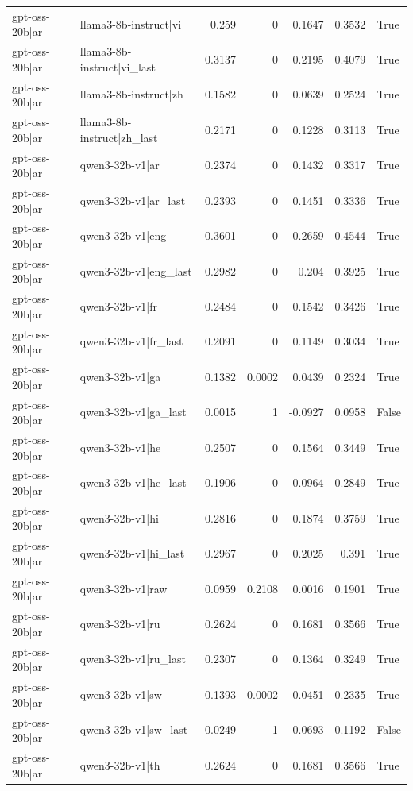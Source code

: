 \begin{table}
\begin{tabular}{l l r r r r l}
gpt-oss-20b|ar & llama3-8b-instruct|vi & 0.259 & 0 & 0.1647 & 0.3532 & True \\
gpt-oss-20b|ar & llama3-8b-instruct|vi_last & 0.3137 & 0 & 0.2195 & 0.4079 & True \\
gpt-oss-20b|ar & llama3-8b-instruct|zh & 0.1582 & 0 & 0.0639 & 0.2524 & True \\
gpt-oss-20b|ar & llama3-8b-instruct|zh_last & 0.2171 & 0 & 0.1228 & 0.3113 & True \\
gpt-oss-20b|ar & qwen3-32b-v1|ar & 0.2374 & 0 & 0.1432 & 0.3317 & True \\
gpt-oss-20b|ar & qwen3-32b-v1|ar_last & 0.2393 & 0 & 0.1451 & 0.3336 & True \\
gpt-oss-20b|ar & qwen3-32b-v1|eng & 0.3601 & 0 & 0.2659 & 0.4544 & True \\
gpt-oss-20b|ar & qwen3-32b-v1|eng_last & 0.2982 & 0 & 0.204 & 0.3925 & True \\
gpt-oss-20b|ar & qwen3-32b-v1|fr & 0.2484 & 0 & 0.1542 & 0.3426 & True \\
gpt-oss-20b|ar & qwen3-32b-v1|fr_last & 0.2091 & 0 & 0.1149 & 0.3034 & True \\
gpt-oss-20b|ar & qwen3-32b-v1|ga & 0.1382 & 0.0002 & 0.0439 & 0.2324 & True \\
gpt-oss-20b|ar & qwen3-32b-v1|ga_last & 0.0015 & 1 & -0.0927 & 0.0958 & False \\
gpt-oss-20b|ar & qwen3-32b-v1|he & 0.2507 & 0 & 0.1564 & 0.3449 & True \\
gpt-oss-20b|ar & qwen3-32b-v1|he_last & 0.1906 & 0 & 0.0964 & 0.2849 & True \\
gpt-oss-20b|ar & qwen3-32b-v1|hi & 0.2816 & 0 & 0.1874 & 0.3759 & True \\
gpt-oss-20b|ar & qwen3-32b-v1|hi_last & 0.2967 & 0 & 0.2025 & 0.391 & True \\
gpt-oss-20b|ar & qwen3-32b-v1|raw & 0.0959 & 0.2108 & 0.0016 & 0.1901 & True \\
gpt-oss-20b|ar & qwen3-32b-v1|ru & 0.2624 & 0 & 0.1681 & 0.3566 & True \\
gpt-oss-20b|ar & qwen3-32b-v1|ru_last & 0.2307 & 0 & 0.1364 & 0.3249 & True \\
gpt-oss-20b|ar & qwen3-32b-v1|sw & 0.1393 & 0.0002 & 0.0451 & 0.2335 & True \\
gpt-oss-20b|ar & qwen3-32b-v1|sw_last & 0.0249 & 1 & -0.0693 & 0.1192 & False \\
gpt-oss-20b|ar & qwen3-32b-v1|th & 0.2624 & 0 & 0.1681 & 0.3566 & True \\

\end{tabular}
\end{table}
